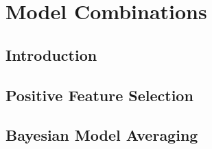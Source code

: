 
\chapter{Model Combinations}
\label{cha:bma}

\section{Introduction}
\label{sec:into}

\section{Positive Feature Selection}
\label{sec:notation}

\section{Bayesian Model Averaging}
\label{sec:bma}

